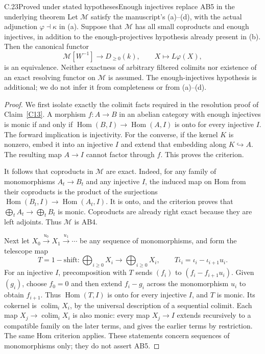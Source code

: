 \begin{claim}{C.23}{Proved under stated hypotheses}{Enough injectives replace AB5 in the underlying theorem}\label{C23}
Let $\mathcal M$ satisfy the manuscript's (a)--(d), with the actual adjunction $\varphi\dashv\kappa$ in (a). Suppose that $\mathcal M$ has all small coproducts and enough injectives, in addition to the enough-projectives hypothesis already present in (b). Then the canonical functor
\[
 \mathcal M[W^{-1}]\longrightarrow D_{\geq0}(k),
 \qquad X\longmapsto L\varphi(X),
\]
is an equivalence. Neither exactness of arbitrary filtered colimits nor existence of an exact resolving functor on $\mathcal M$ is assumed. The enough-injectives hypothesis is additional; we do not infer it from completeness or from (a)--(d).
\end{claim}
\begin{proof}
We first isolate exactly the colimit facts required in the resolution proof of Claim~\ref{C13}. A morphism $f:A\to B$ in an abelian category with enough injectives is monic if and only if $\operatorname{Hom}(B,I)\to\operatorname{Hom}(A,I)$ is onto for every injective $I$. The forward implication is injectivity. For the converse, if the kernel $K$ is nonzero, embed it into an injective $I$ and extend that embedding along $K\hookrightarrow A$. The resulting map $A\to I$ cannot factor through $f$. This proves the criterion.

It follows that coproducts in $\mathcal M$ are exact. Indeed, for any family of monomorphisms $A_t\to B_t$ and any injective $I$, the induced map on Hom from their coproducts is the product of the surjections $\operatorname{Hom}(B_t,I)\to\operatorname{Hom}(A_t,I)$. It is onto, and the criterion proves that $\bigoplus_t A_t\to\bigoplus_t B_t$ is monic. Coproducts are already right exact because they are left adjoints. Thus $\mathcal M$ is AB4.

Next let $X_0\xrightarrow{u_0}X_1\xrightarrow{u_1}\cdots$ be any sequence of monomorphisms, and form the telescope map
\[
 T=1-\mathrm{shift}:\bigoplus_{i\geq0}X_i
       \longrightarrow\bigoplus_{i\geq0}X_i,
 \qquad T\iota_i=\iota_i-\iota_{i+1}u_i.
\]
For an injective $I$, precomposition with $T$ sends $(f_i)$ to $(f_i-f_{i+1}u_i)$. Given $(g_i)$, choose $f_0=0$ and then extend $f_i-g_i$ across the monomorphism $u_i$ to obtain $f_{i+1}$. Thus $\operatorname{Hom}(T,I)$ is onto for every injective $I$, and $T$ is monic. Its cokernel is $\operatorname{colim}_iX_i$, by the universal description of a sequential colimit. Each map $X_j\to\operatorname{colim}_iX_i$ is also monic: every map $X_j\to I$ extends recursively to a compatible family on the later terms, and gives the earlier terms by restriction. The same Hom criterion applies. These statements concern sequences of monomorphisms only; they do not assert AB5.


\end{proof}
